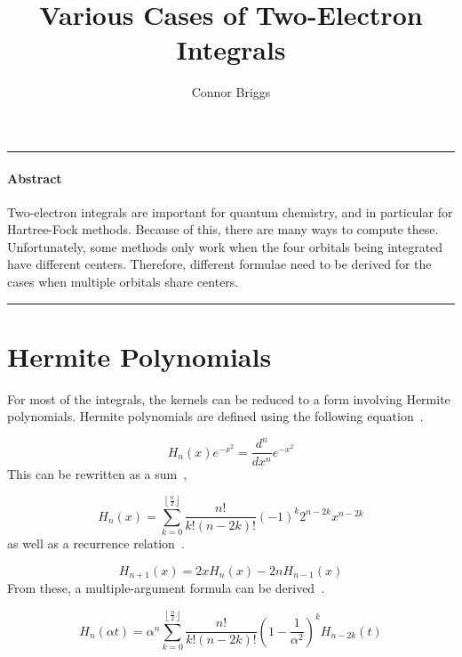 \documentclass[twoside,10pt,draft]{article}
\begin{document}

\renewcommand\theequation{\thesection.\arabic{equation}}

\title{Various Cases of Two-Electron Integrals}
\author{Connor Briggs}
\maketitle

\hrule
\paragraph*{Abstract} Two-electron integrals are important for quantum chemistry, and in particular for Hartree-Fock methods. Because of this, there are many ways to compute these. Unfortunately, some methods only work when the four orbitals being integrated have different centers. Therefore, different formulae need to be derived for the cases when multiple orbitals share centers.\\
\hrule


\lhead[]{\thepage}
\rhead[\thepage]{}

\section{Hermite Polynomials}

For most of the integrals, the kernels can be reduced to a form involving Hermite polynomials. Hermite polynomials are defined using the following equation~\cite{wolfram-hermite}.

\begin{equation}
  H_n(x) e^{-x^2} = \frac{d^n}{dx^n} e^{-x^2}
  \label{herm-def}
\end{equation}
This can be rewritten as a sum~\cite{wolfram-hermite},

\begin{equation}
  H_n(x) = \sum_{k = 0}^{\left\lfloor\frac{n}{2}\right\rfloor} \frac{n!}{k!(n - 2k)!}(-1)^k 2^{n - 2k} x^{n - 2k}
  \label{herm-sum}
\end{equation}
as well as a recurrence relation~\cite{wolfram-hermite}.

\begin{equation}
  H_{n + 1}(x) = 2xH_{n}(x) - 2nH_{n - 1}(x)
  \label{herm-recur}
\end{equation}
From these, a multiple-argument formula can be derived~\cite{wolfram-hermite}.

\begin{equation}
  H_n(\alpha t) = \alpha^n \sum_{k = 0}^{\left\lfloor\frac{n}{2}\right\rfloor}\frac{n!}{k!(n - 2k)!}\left(1 - \frac{1}{\alpha^2}\right)^k H_{n - 2k}(t)
  \label{herm-maf}
\end{equation}
\end{document}
